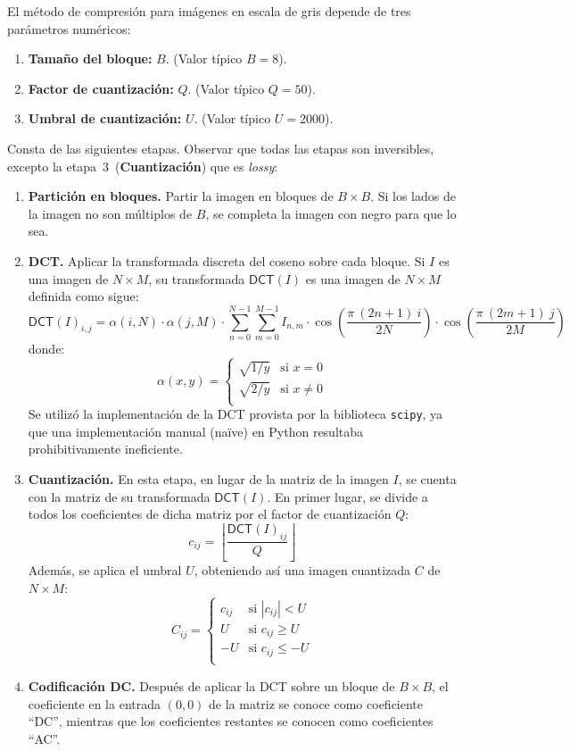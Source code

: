 \documentclass{article}
\begin{document}
El método de compresión para imágenes en escala de gris
depende de tres parámetros numéricos:
\begin{enumerate}
\item {\bf Tamaño del bloque:} $B$. (Valor típico $B = 8$).
\item {\bf Factor de cuantización:} $Q$. (Valor típico $Q = 50$).
\item {\bf Umbral de cuantización:} $U$. (Valor típico $U = 2000$).
\end{enumerate}
Consta de las siguientes etapas. Observar que todas las etapas
son inversibles, excepto la etapa~3~({\bf Cuantización})
que es {\em lossy}:
\begin{enumerate}
\item
  {\bf Partición en bloques.}
  Partir la imagen en bloques de $B \times B$.
  Si los lados de la imagen no son múltiplos de $B$,
  se completa la imagen con negro para que lo sea. 
\item
  {\bf DCT.}
  Aplicar la transformada discreta del coseno sobre cada bloque.
  Si $I$ es una imagen de $N \times M$,
  su transformada
  $\mathsf{DCT}(I)$ es una imagen de $N \times M$
  definida como sigue:
  \[
    \mathsf{DCT}(I)_{i,j} =
    \alpha(i, N)
    \cdot
    \alpha(j, M)
    \cdot
    \sum_{n=0}^{N-1} \sum_{m=0}^{M-1}
      I_{n,m} \cdot
      \cos\left(\frac{\pi\ (2n + 1)\ i}{2N}\right) \cdot
      \cos\left(\frac{\pi\ (2m + 1)\ j}{2M}\right)
  \]
  donde:
  \[
    \alpha(x, y) = \begin{cases}
                     \sqrt{1/y} & \text{si $x = 0$} \\
                     \sqrt{2/y} & \text{si $x \neq 0$} \\
                   \end{cases}
  \]
  Se utilizó la implementación de la DCT provista por
  la biblioteca \texttt{scipy}, ya que una implementación
  manual (naïve) en Python resultaba prohibitivamente ineficiente.
\item
  {\bf Cuantización.}
  En esta etapa, en lugar de la matriz de la imagen $I$,
  se cuenta con la matriz de su transformada $\mathsf{DCT}(I)$.
  En primer lugar, se divide a todos los coeficientes de dicha
  matriz por el factor de cuantización $Q$:
  \[
    c_{ij} = \left\lfloor\frac{\mathsf{DCT}(I)_{ij}}{Q}\right\rfloor
  \]
  Además, se aplica el umbral $U$, obteniendo así una imagen
  cuantizada $C$ de $N \times M$:
  \[
    C_{ij} =
    \begin{cases}
      c_{ij} & \text{si $|c_{ij}| < U$} \\
      U      & \text{si $c_{ij} \geq U$} \\
      -U     & \text{si $c_{ij} \leq -U$} \\
    \end{cases}
  \]
\item
  {\bf Codificación DC.}
  Después de aplicar la DCT sobre un bloque de $B \times B$,
  el coeficiente en la entrada $(0, 0)$ de la matriz se conoce
  como coeficiente ``DC'', mientras que los coeficientes restantes
  se conocen como coeficientes ``AC''.


\end{enumerate}
\end{document}
